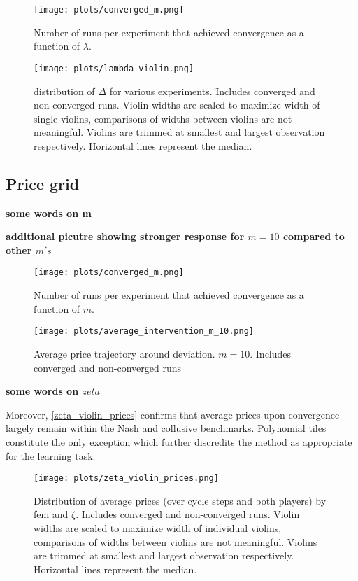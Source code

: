 \begin{figure}
	\texttt{[image: plots/converged\_m.png]}
	\caption{Number of runs per experiment that achieved convergence as a function of $\lambda$.}
	\label{converged_lambda}
\end{figure}

\begin{figure}
	\texttt{[image: plots/lambda\_violin.png]}
	\caption{distribution of $\Delta$ for various experiments. Includes converged and non-converged runs. Violin widths are scaled to maximize width of single violins, comparisons of widths between violins are not meaningful. Violins are trimmed at smallest and largest observation respectively. Horizontal lines represent the median.}
	\label{lambda_violin}
\end{figure}


\pagebreak
\subsection{Price grid}\label{price_grid_appendix}

\textbf{some words on m}

\textbf{additional picutre showing stronger response for $m=10$ compared to other $m's$}

\begin{figure}
	\texttt{[image: plots/converged\_m.png]}
	\caption{Number of runs per experiment that achieved convergence as a function of $m$.}
	\label{converged_m}
\end{figure}


\begin{figure}
	\texttt{[image: plots/average\_intervention\_m\_10.png]}
	\caption{Average price trajectory around deviation. $m=10$. Includes converged and non-converged runs}
	\label{average_intervention_m_10}
\end{figure}

\textbf{some words on $zeta$}

Moreover, \autoref{zeta_violin_prices} confirms that average prices upon convergence largely remain within the Nash and collusive benchmarks. Polynomial tiles constitute the only exception which further discredits the method as appropriate for the learning task.

\begin{figure}
	\texttt{[image: plots/zeta\_violin\_prices.png]}
	\caption[Distribution of average prices by \gls{fem} and $\zeta$]{Distribution of average prices (over cycle steps and both players) by \gls{fem} and $\zeta$. Includes converged and non-converged runs. Violin widths are scaled to maximize width of individual violins, comparisons of widths between violins are not meaningful. Violins are trimmed at smallest and largest observation respectively. Horizontal lines represent the median.}
	\label{zeta_violin_prices}
\end{figure}


